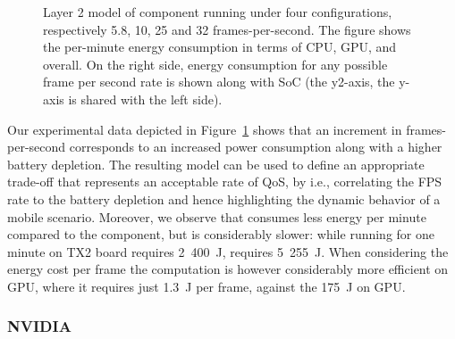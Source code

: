 \begin{figure}[t]
  \centering
  \caption[Layer 2 model of  component]{Layer 2 model of  component running under four configurations, respectively 5.8, 10, 25 and 32 frames-per-second. The figure shows the per-minute energy consumption in terms of CPU, GPU, and overall. On the right side, energy consumption for any possible frame per second rate is shown along with SoC (the y2-axis, the y-axis is shared with the left side).}
  \label{fig:darknet-layer2}
\end{figure}

Our experimental data depicted in Figure~\ref{fig:darknet-layer2} shows that an increment in frames-per-second corresponds to an increased power consumption along with a higher battery depletion. The resulting model can be used to define an appropriate trade-off that represents an acceptable rate of QoS, by i.e., correlating the FPS rate to the battery depletion and hence highlighting the dynamic behavior of a mobile scenario.
Moreover, we observe that  consumes less energy per minute compared to the  component, but is considerably slower: while running  for one minute on TX2 board requires 2~400~J,  requires 5~255~J. When considering the energy cost per frame the computation is however considerably more efficient on GPU, where it requires just 1.3~J per frame, against the 175~J on GPU. %

\subsubsection*{\color{cyan}NVIDIA}

